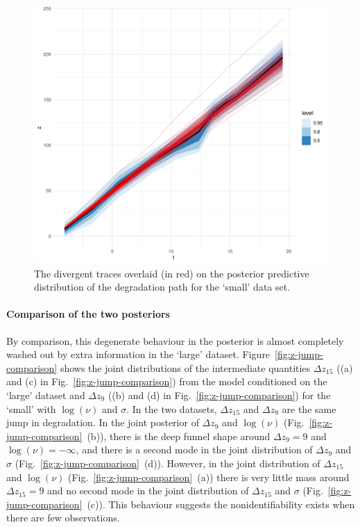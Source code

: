 \begin{figure}
  \centering
  \includegraphics[width=0.8\columnwidth]{./figures/ch-4/zppd-divergencies.pdf}
  \caption{The divergent traces overlaid (in red) on the posterior predictive distribution of the degradation path for the `small' data set.}
  \label{fig:z-ppd-divergent}
\end{figure}

\paragraph*{Comparison of the two posteriors}
By comparison, this degenerate behaviour in the posterior is almost completely washed out by extra information in the `large' dataset. Figure~\ref{fig:z-jump-comparison} shows the joint distributions of the intermediate quantities $\Delta z_{15}$ ((a) and (c) in Fig.~\ref{fig:z-jump-comparison}) from the model conditioned on the `large' dataset and $\Delta z_{9}$ ((b) and (d) in Fig.~\ref{fig:z-jump-comparison}) for the `small' with $\log(\nu)$ and $\sigma$. In the two datasets, $\Delta z_{15}$ and $\Delta z_{9}$ are the same jump in degradation. In the joint posterior of $\Delta z_{9}$ and $\log(\nu)$ (Fig.~\ref{fig:z-jump-comparison}~(b)), there is the deep funnel shape around $\Delta z_{9} = 9$ and $\log(\nu) = -\infty$, and there is a second mode in the joint distribution of $\Delta z_{9}$ and $\sigma$ (Fig.~\ref{fig:z-jump-comparison}~(d)). However, in the joint distribution of $\Delta z_{15}$ and $\log(\nu)$ (Fig.~\ref{fig:z-jump-comparison}~(a)) there is very little mass around $\Delta z_{15} = 9$ and no second mode in the joint distribution of $\Delta z_{15}$ and $\sigma$ (Fig.~\ref{fig:z-jump-comparison}~(c)). This behaviour suggests the nonidentifiability exists when there are few observations.

